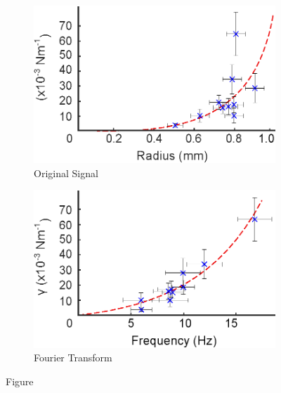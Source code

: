 \documentclass{physics_article_B}
\begin{document}
        \begin{figure}[H]
            \centering   
            \begin{subfigure}[b]{0.48\textwidth}
                \hspace*{0cm}\includegraphics[width=\textwidth]{Figures/r_vs_gamma.eps}
                \caption{Original Signal}
                \label{fig:vsgamma:r}
            \end{subfigure}\hspace{3pt}
            \begin{subfigure}[b]{0.48\textwidth}
                \hspace*{0.1cm}\includegraphics[width=\textwidth]{Figures/f_vs_gamma.eps} 
                \caption{Fourier Transform}
                \label{fig:vsgamma:f}
                \end{subfigure}
            \caption{Figure }\label{fig:vsgamma}
        \end{figure} 
     
\end{document}
